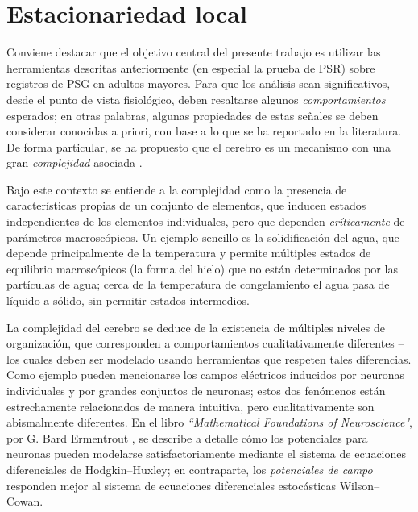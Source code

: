 \documentclass[12pt,letterpaper]{book}
\begin{document}


\section{Estacionariedad local}
\label{sec:est_local}

Conviene destacar que el objetivo central del presente trabajo es utilizar las herramientas descritas anteriormente (en especial la prueba de PSR) sobre registros de PSG en adultos mayores.
%
Para que los análisis sean significativos, desde el punto de vista fisiológico, deben resaltarse algunos \textit{comportamientos} esperados; en otras palabras, algunas propiedades de estas señales  se deben considerar conocidas a priori, con base a lo que se ha reportado en la literatura.
%
De forma particular, se ha propuesto que el cerebro es un mecanismo con una gran \textit{complejidad} asociada \cite{Werner09}.

Bajo este contexto se entiende a la complejidad como la presencia de características propias de un conjunto de elementos, que inducen {estados} independientes de los elementos individuales, pero que dependen \textit{críticamente} de parámetros macroscópicos.
%
Un ejemplo sencillo es la solidificación del agua, que depende principalmente de la temperatura y permite múltiples estados de equilibrio macroscópicos (la forma del hielo) que no están determinados por las partículas de agua; cerca de la temperatura de congelamiento el agua pasa de líquido a sólido, sin permitir estados intermedios.

La complejidad del cerebro se deduce de la existencia de múltiples niveles de organización, que corresponden a comportamientos cualitativamente diferentes --los cuales deben ser modelado usando herramientas que respeten tales diferencias.
%
Como ejemplo pueden mencionarse los campos eléctricos inducidos por neuronas individuales y por grandes conjuntos de neuronas; estos dos fenómenos están estrechamente relacionados de manera intuitiva, pero cualitativamente son abismalmente diferentes.
%
En el libro \textit{``Mathematical Foundations of Neuroscience"}, por G. Bard Ermentrout \cite{Ermentrout10}, se describe a detalle cómo los potenciales para neuronas pueden modelarse satisfactoriamente mediante el sistema de ecuaciones diferenciales de Hodgkin--Huxley; en contraparte, los \textit{potenciales de campo} responden mejor al sistema de ecuaciones diferenciales estocásticas Wilson--Cowan.
\end{document}
